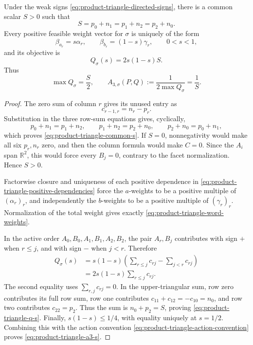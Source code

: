 \begin{unverified}
\begin{lemma}
\label{lem:product-triangle-sign-cell-algebra}
Under the weak signs \eqref{eq:product-triangle-directed-signs}, there is a
common scalar \(S>0\) such that
\begin{equation}
\label{eq:product-triangle-common-s}
 S=p_0+n_1=p_1+n_2=p_2+n_0.
\end{equation}
Every positive feasible weight vector for \(\sigma\) is uniquely of the form
\begin{equation}
\label{eq:product-triangle-word-weights}
 \beta_{a_r}=s\alpha_r,\qquad
 \beta_{b_r}=(1-s)\gamma_r,\qquad 0<s<1,
\end{equation}
and its objective is
\begin{equation}
\label{eq:product-triangle-q-s}
 Q_\sigma(s)=2s(1-s)S.
\end{equation}
Thus
\begin{equation}
\label{eq:product-triangle-a3-s}
 \max Q_\sigma=\frac S2,\qquad
 A_{3,\sigma}(P,Q):=\frac1{2\max Q_\sigma}=\frac1S.
\end{equation}
\end{lemma}

\begin{proof}
The zero sum of column \(r\) gives its unused entry as
\[
 c_{r-1,r}=n_r-p_r.
\]
Substitution in the three row-sum equations gives, cyclically,
\[
 p_0+n_1=p_1+n_2,\qquad
 p_1+n_2=p_2+n_0,\qquad
 p_2+n_0=p_0+n_1,
\]
which proves \eqref{eq:product-triangle-common-s}.  If \(S=0\),
nonnegativity would make all six \(p_r,n_r\) zero, and then the column formula
would make \(C=0\).  Since the \(A_i\) span \(\mathbb R^2\), this would force
every \(B_j=0\), contrary to the facet normalization.  Hence \(S>0\).

Factorwise closure and uniqueness of each positive dependence in
\eqref{eq:product-triangle-positive-dependencies} force the \(a\)-weights to
be a positive multiple of \((\alpha_r)_r\), and independently the
\(b\)-weights to be a positive multiple of \((\gamma_r)_r\).  Normalization
of the total weight gives exactly \eqref{eq:product-triangle-word-weights}.

In the active order \(A_0,B_0,A_1,B_1,A_2,B_2\), the pair \(A_r,B_j\)
contributes with sign \(+\) when \(r\leq j\), and with sign \(-\) when
\(j<r\).  Therefore
\[
 \begin{aligned}
 Q_\sigma(s)
 &=s(1-s)\left(\sum_{r\leq j}c_{rj}
                         -\sum_{j<r}c_{rj}\right)\\
 &=2s(1-s)\sum_{r\leq j}c_{rj}.
 \end{aligned}
\]
The second equality uses \(\sum_{r,j}c_{rj}=0\).  In the upper-triangular
sum, row zero contributes its full row sum, row one contributes
\(c_{11}+c_{12}=-c_{10}=n_0\), and row two contributes \(c_{22}=p_2\).
Thus the sum is \(n_0+p_2=S\), proving
\eqref{eq:product-triangle-q-s}.  Finally,
\(s(1-s)\leq1/4\), with equality uniquely at \(s=1/2\).  Combining this
with the action convention \eqref{eq:product-triangle-action-convention}
proves \eqref{eq:product-triangle-a3-s}.
\end{proof}
\end{unverified}

